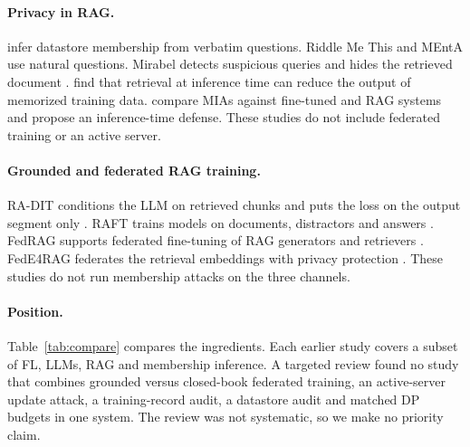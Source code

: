 \documentclass[11pt]{article}
\begin{document}
\paragraph{Privacy in RAG.} \citet{anderson2024membership} infer datastore membership from verbatim questions. Riddle Me This \citep{naseh2025riddle} and MEntA \citep{nguyen2026menta} use natural questions. Mirabel detects suspicious queries and hides the retrieved document \citep{choi2025mirabel}. \citet{zeng2024good} find that retrieval at inference time can reduce the output of memorized training data. \citet{fu2025ensemble} compare MIAs against fine-tuned and RAG systems and propose an inference-time defense. These studies do not include federated training or an active server.

\paragraph{Grounded and federated RAG training.} RA-DIT conditions the LLM on retrieved chunks and puts the loss on the output segment only \citep{lin2024radit}. RAFT trains models on documents, distractors and answers \citep{zhang2024raft}. FedRAG supports federated fine-tuning of RAG generators and retrievers \citep{fajardo2025fedrag}. FedE4RAG federates the retrieval embeddings with privacy protection \citep{mao2025fede4rag}. These studies do not run membership attacks on the three channels.

\paragraph{Position.} Table~\ref{tab:compare} compares the ingredients. Each earlier study covers a subset of FL, LLMs, RAG and membership inference. A targeted review found no study that combines grounded versus closed-book federated training, an active-server update attack, a training-record audit, a datastore audit and matched DP budgets in one system. The review was not systematic, so we make no priority claim.
\end{document}
